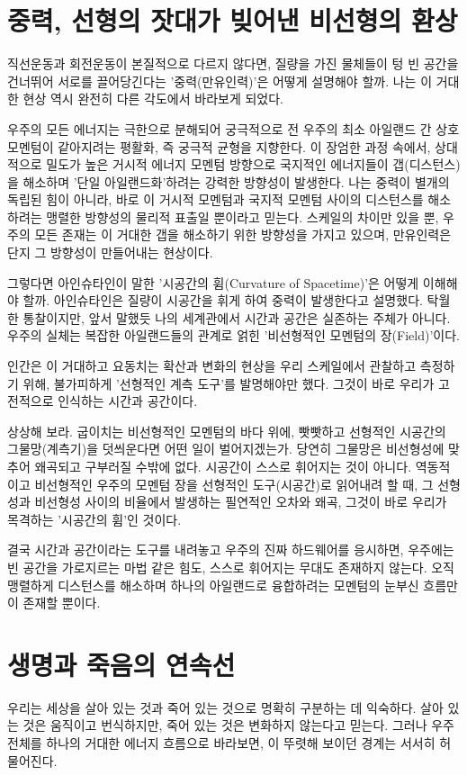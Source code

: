 \documentclass[12pt,a4paper]{article}
\begin{document}
\section{중력, 선형의 잣대가 빚어낸 비선형의 환상}
직선운동과 회전운동이 본질적으로 다르지 않다면, 질량을 가진 물체들이 텅 빈 공간을 건너뛰어 서로를 끌어당긴다는 '중력(만유인력)'은 어떻게 설명해야 할까. 나는 이 거대한 현상 역시 완전히 다른 각도에서 바라보게 되었다.

우주의 모든 에너지는 극한으로 분해되어 궁극적으로 전 우주의 최소 아일랜드 간 상호 모멘텀이 같아지려는 평활화, 즉 궁극적 균형을 지향한다. 이 장엄한 과정 속에서, 상대적으로 밀도가 높은 거시적 에너지 모멘텀 방향으로 국지적인 에너지들이 갭(디스턴스)을 해소하며 '단일 아일랜드화'하려는 강력한 방향성이 발생한다. 나는 중력이 별개의 독립된 힘이 아니라, 바로 이 거시적 모멘텀과 국지적 모멘텀 사이의 디스턴스를 해소하려는 맹렬한 방향성의 물리적 표출일 뿐이라고 믿는다. 스케일의 차이만 있을 뿐, 우주의 모든 존재는 이 거대한 갭을 해소하기 위한 방향성을 가지고 있으며, 만유인력은 단지 그 방향성이 만들어내는 현상이다.

그렇다면 아인슈타인이 말한 '시공간의 휨(Curvature of Spacetime)'은 어떻게 이해해야 할까. 아인슈타인은 질량이 시공간을 휘게 하여 중력이 발생한다고 설명했다. 탁월한 통찰이지만, 앞서 말했듯 나의 세계관에서 시간과 공간은 실존하는 주체가 아니다. 우주의 실체는 복잡한 아일랜드들의 관계로 얽힌 '비선형적인 모멘텀의 장(Field)'이다.

인간은 이 거대하고 요동치는 확산과 변화의 현상을 우리 스케일에서 관찰하고 측정하기 위해, 불가피하게 '선형적인 계측 도구'를 발명해야만 했다. 그것이 바로 우리가 고전적으로 인식하는 시간과 공간이다.

상상해 보라. 굽이치는 비선형적인 모멘텀의 바다 위에, 빳빳하고 선형적인 시공간의 그물망(계측기)을 덧씌운다면 어떤 일이 벌어지겠는가. 당연히 그물망은 비선형성에 맞추어 왜곡되고 구부러질 수밖에 없다. 시공간이 스스로 휘어지는 것이 아니다. 역동적이고 비선형적인 우주의 모멘텀 장을 선형적인 도구(시공간)로 읽어내려 할 때, 그 선형성과 비선형성 사이의 비율에서 발생하는 필연적인 오차와 왜곡, 그것이 바로 우리가 목격하는 '시공간의 휨'인 것이다.

결국 시간과 공간이라는 도구를 내려놓고 우주의 진짜 하드웨어를 응시하면, 우주에는 빈 공간을 가로지르는 마법 같은 힘도, 스스로 휘어지는 무대도 존재하지 않는다. 오직 맹렬하게 디스턴스를 해소하며 하나의 아일랜드로 융합하려는 모멘텀의 눈부신 흐름만이 존재할 뿐이다.

\section{생명과 죽음의 연속선}
우리는 세상을 살아 있는 것과 죽어 있는 것으로 명확히 구분하는 데 익숙하다. 살아 있는 것은 움직이고 번식하지만, 죽어 있는 것은 변화하지 않는다고 믿는다. 그러나 우주 전체를 하나의 거대한 에너지 흐름으로 바라보면, 이 뚜렷해 보이던 경계는 서서히 허물어진다.
\end{document}
